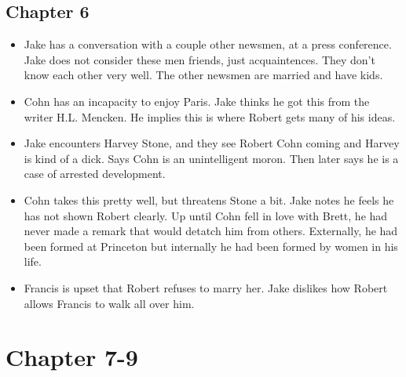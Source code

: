\documentclass[11pt]{article}
\begin{document}
\subsection{Chapter 6}
\begin{itemize}
	\item Jake has a conversation with a couple other newsmen, at a press 
		conference.  Jake does not consider these men friends, just 
		acquaintences.  They don't know each other very well.  The other 
		newsmen are married and have kids.
	\item Cohn has an incapacity to enjoy Paris.  Jake thinks he got this from 
		the writer H.L. Mencken.  He implies this is where Robert gets many of 
		his ideas. 
	\item Jake encounters Harvey Stone, and they see Robert Cohn coming and 
		Harvey is kind of a dick.  Says Cohn is an unintelligent moron.  Then 
		later says he is a case of arrested development.
	\item Cohn takes this pretty well, but threatens Stone a bit.  Jake notes 
		he feels he has not shown Robert clearly.  Up until Cohn fell in love 
		with Brett, he had never made a remark that would detatch him from 
		others.  Externally, he had been formed at Princeton but internally he 
		had been formed by women in his life.
	\item Francis is upset that Robert refuses to marry her.  Jake dislikes 
		how Robert allows Francis to walk all over him.
	\end{itemize}
\section{Chapter 7-9}
\end{document}

